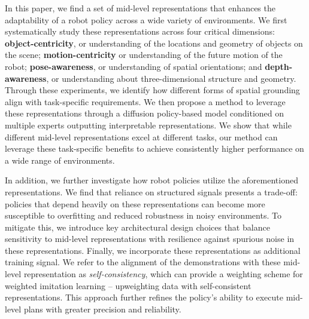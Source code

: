 \documentclass[conference,dvipsnames]{IEEEtran}
\begin{document}


In this paper, we find a set of mid-level representations that enhances the adaptability of a robot policy across a wide variety of environments. We first systematically study these representations across four critical dimensions: \textbf{object-centricity}, or understanding of the locations  and geometry of objects on the scene; \textbf{motion-centricity} or understanding of the future motion of the robot; \textbf{pose-awareness}, or understanding of spatial orientations; and \textbf{depth-awareness}, or understanding about three-dimensional structure and geometry. Through these experiments, we identify how different forms of spatial grounding align with task-specific requirements. We then propose a method to leverage these representations through a diffusion policy-based model conditioned on multiple experts outputting interpretable representations. We show that while different mid-level representations excel at different tasks, our method can leverage these task-specific benefits to achieve consistently higher performance on a wide range of environments. 

In addition, we further investigate how robot policies utilize the aforementioned representations. We find that reliance on structured signals presents a trade-off: policies that depend heavily on these representations can become more susceptible to overfitting and reduced robustness in noisy environments. To mitigate this, we introduce key architectural design choices that balance sensitivity to mid-level representations with resilience against spurious noise in these representations. Finally, we incorporate these representations as additional training signal.
We refer to the alignment of the demonstrations with these mid-level representation as \textit{self-consistency}, which can provide a weighting scheme for weighted imitation learning -- upweighting data with self-consistent representations. This approach further refines the policy’s ability to execute mid-level plans with greater precision and reliability.
\end{document}
